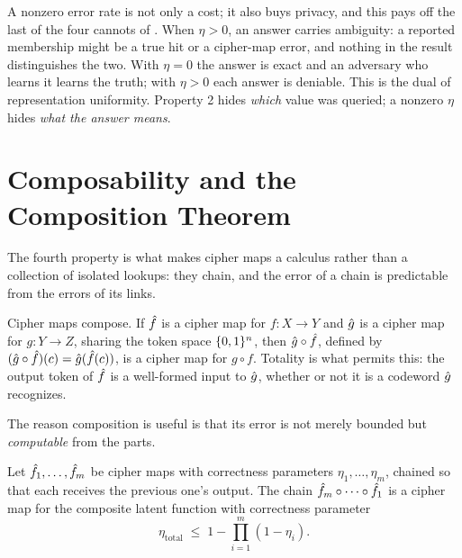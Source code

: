 \begin{remark}
\label{rem:deniability}
A nonzero error rate is not only a cost; it also buys privacy, and this pays
off the last of the four cannots of . When
$\eta > 0$, an answer carries ambiguity: a reported membership might be a
true hit or a cipher-map error, and nothing in the result distinguishes the
two. With $\eta = 0$ the answer is exact and an adversary who learns it
learns the truth; with $\eta > 0$ each answer is deniable. This is the dual
of representation uniformity. Property 2 hides \emph{which} value was
queried; a nonzero $\eta$ hides \emph{what the answer means}.
\end{remark}

\section{Composability and the Composition Theorem}
\label{sec:composability}

The fourth property is what makes cipher maps a calculus rather than a
collection of isolated lookups: they chain, and the error of a chain is
predictable from the errors of its links.

\begin{definition}
\label{def:composability}
Cipher maps compose. If $\hat{f}$ is a cipher map for $f : X \to Y$ and $\hat{g}$
is a cipher map for $g : Y \to Z$, sharing the token space $\{0,1\}^n$, then
$\hat{g} \circ \hat{f}$, defined by $(\hat{g} \circ \hat{f})(c) = \hat{g}(\hat{f}(c))$,
is a cipher map for $g \circ f$. Totality is what permits this: the output
token of $\hat{f}$ is a well-formed input to $\hat{g}$, whether or not it is a
codeword $\hat{g}$ recognizes.
\end{definition}

The reason composition is useful is that its error is not merely bounded but
\emph{computable} from the parts.

\begin{theorem}[Composition]
\label{thm:composition}
Let $\hat{f}_1, \ldots, \hat{f}_m$ be cipher maps with correctness parameters
$\eta_1, \ldots, \eta_m$, chained so that each receives the previous one's
output. The chain $\hat{f}_m \circ \cdots \circ \hat{f}_1$ is a cipher map for
the composite latent function with correctness parameter
\[
  \eta_{\mathrm{total}} \;\leq\; 1 - \prod_{i=1}^{m} (1 - \eta_i) .
\]
\end{theorem}

